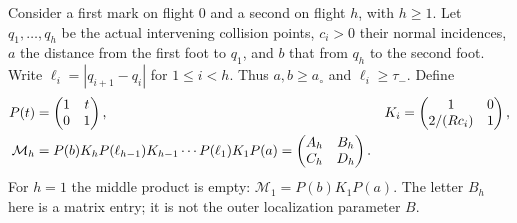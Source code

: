 Consider a first mark on flight $0$ and a second on flight $h$, with
$h\ge1$. Let $q_1,\ldots,q_h$ be the actual intervening collision
points, $c_i>0$ their normal incidences, $a$ the distance from the first
foot to $q_1$, and $b$ that from $q_h$ to the second foot. Write
$\ell_i=|q_{i+1}-q_i|$ for $1\le i<h$. Thus
$a,b\ge a_\circ$ and $\ell_i\ge\tau_-$. Define
\begin{align}
 P(t)&=\begin{pmatrix}1&t\\0&1\end{pmatrix},&
 K_i&=\begin{pmatrix}1&0\\2/(Rc_i)&1\end{pmatrix},\notag\\
 \mathcal M_h
   &=P(b)K_hP(\ell_{h-1})K_{h-1}\cdots
                           P(\ell_1)K_1P(a)
     =\begin{pmatrix}A_h&B_h\\C_h&D_h\end{pmatrix}.
                                      \label{eq:xf-product}
\end{align}
For $h=1$ the middle product is empty:
$\mathcal M_1=P(b)K_1P(a)$. The letter $B_h$ here is a matrix
entry; it is not the outer localization parameter $B$.

